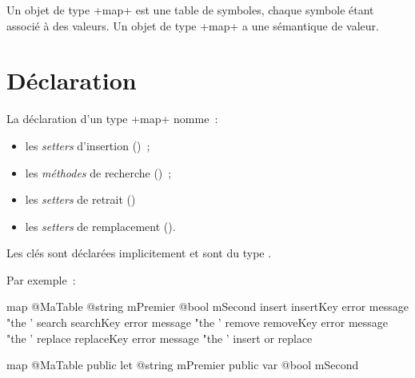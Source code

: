 



Un objet de type \ggsq+map+ est une table de symboles, chaque symbole étant associé à des valeurs. Un objet de type \ggsq+map+ a une sémantique de valeur.

\section{Déclaration}

La déclaration d'un type \ggsq+map+ nomme~:
\begin{itemize}
  \item les \emph{setters} d'insertion ()~;
  \item les \emph{méthodes} de recherche ()~;
  \item les \emph{setters} de retrait ()~
  \item les \emph{setters} de remplacement ().
\end{itemize}

Les clés sont déclarées implicitement et sont du type .

Par exemple~:

\begin{galgas4}
map @MaTable {
  @string mPremier
  @bool mSecond
  insert insertKey error message "the '%
  search searchKey error message "the '%
  remove removeKey error message "the '%
  replace replaceKey error message "the '%
  insert or replace
}
\end{galgas4}


\begin{galgas4}
map @MaTable {
  public let @string mPremier
  public var @bool mSecond
}
\end{galgas4}

